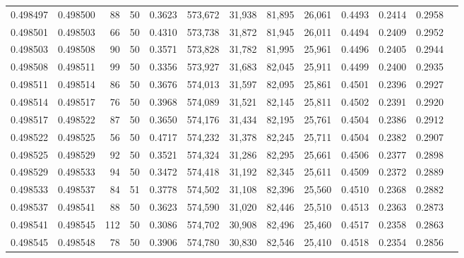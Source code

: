 \begin{tabular}{rrrrrrrrrrrrr}
0.498497 & 0.498500 &    88 &  50 &                                     0.3623 & 573,672 &  31,938 &  81,895 &  26,061 & 0.4493 & 0.2414 & 0.2958 \\
0.498501 & 0.498503 &    66 &  50 &                                     0.4310 & 573,738 &  31,872 &  81,945 &  26,011 & 0.4494 & 0.2409 & 0.2952 \\
0.498503 & 0.498508 &    90 &  50 &                                     0.3571 & 573,828 &  31,782 &  81,995 &  25,961 & 0.4496 & 0.2405 & 0.2944 \\
0.498508 & 0.498511 &    99 &  50 &                                     0.3356 & 573,927 &  31,683 &  82,045 &  25,911 & 0.4499 & 0.2400 & 0.2935 \\
0.498511 & 0.498514 &    86 &  50 &                                     0.3676 & 574,013 &  31,597 &  82,095 &  25,861 & 0.4501 & 0.2396 & 0.2927 \\
0.498514 & 0.498517 &    76 &  50 &                                     0.3968 & 574,089 &  31,521 &  82,145 &  25,811 & 0.4502 & 0.2391 & 0.2920 \\
0.498517 & 0.498522 &    87 &  50 &                                     0.3650 & 574,176 &  31,434 &  82,195 &  25,761 & 0.4504 & 0.2386 & 0.2912 \\
0.498522 & 0.498525 &    56 &  50 &                                     0.4717 & 574,232 &  31,378 &  82,245 &  25,711 & 0.4504 & 0.2382 & 0.2907 \\
0.498525 & 0.498529 &    92 &  50 &                                     0.3521 & 574,324 &  31,286 &  82,295 &  25,661 & 0.4506 & 0.2377 & 0.2898 \\
0.498529 & 0.498533 &    94 &  50 &                                     0.3472 & 574,418 &  31,192 &  82,345 &  25,611 & 0.4509 & 0.2372 & 0.2889 \\
0.498533 & 0.498537 &    84 &  51 &                                     0.3778 & 574,502 &  31,108 &  82,396 &  25,560 & 0.4510 & 0.2368 & 0.2882 \\
0.498537 & 0.498541 &    88 &  50 &                                     0.3623 & 574,590 &  31,020 &  82,446 &  25,510 & 0.4513 & 0.2363 & 0.2873 \\
0.498541 & 0.498545 &   112 &  50 &                                     0.3086 & 574,702 &  30,908 &  82,496 &  25,460 & 0.4517 & 0.2358 & 0.2863 \\
0.498545 & 0.498548 &    78 &  50 &                                     0.3906 & 574,780 &  30,830 &  82,546 &  25,410 & 0.4518 & 0.2354 & 0.2856 \\

\end{tabular}
